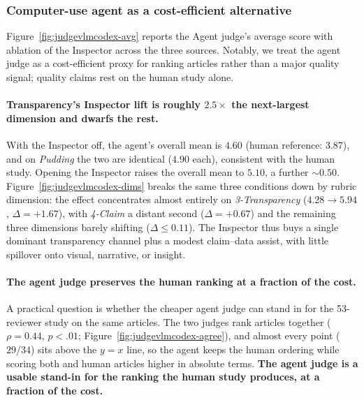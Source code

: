 \subsubsection{Computer-use agent as a cost-efficient alternative}
Figure~\ref{fig:judgevlmcodex-avg} reports the Agent judge's average score with ablation of the Inspector across the three sources. %
Notably, we treat the agent judge as a cost-efficient proxy for ranking articles rather than a major quality signal; quality claims rest on the human study alone.
\paragraph{Transparency's Inspector lift is roughly $2.5{\times}$ the next-largest dimension and dwarfs the rest.}
With the Inspector off, the agent's overall mean is $4.60$ (human reference: $3.87$), and on \textit{Pudding} the two are identical ($4.90$ each), consistent with the human study. Opening the Inspector raises the overall mean to $5.10$, a further $\sim{}0.50$.
Figure~\ref{fig:judgevlmcodex-dims} breaks the same three conditions down by rubric dimension: the effect concentrates almost entirely on \emph{3-Transparency} ($4.28{\to}5.94$, $\Delta{=}{+}1.67$), with \emph{4-Claim} a distant second ($\Delta{=}{+}0.67$) and the remaining three dimensions barely shifting ($\Delta{\le}0.11$).
The Inspector thus buys a single dominant transparency channel plus a modest claim--data assist, with little spillover onto visual, narrative, or insight.

\paragraph{The agent judge preserves the human ranking at a fraction of the cost.}
A practical question is whether the cheaper agent judge can stand in for the 53-reviewer study on the same articles. The two judges rank articles together ($\rho{=}0.44$, $p{<}.01$;
Figure~\ref{fig:judgevlmcodex-agree}), and almost every point ($29{/}34$) sits above the $y{=}x$ line, so the agent keeps the human ordering while scoring both \methodshort{} and human articles higher in absolute terms.
\textbf{The agent judge is a usable stand-in for the ranking the human study produces, at a fraction of the cost.}


